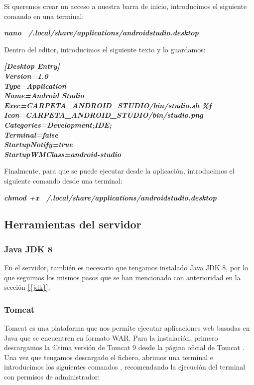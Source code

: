 Si queremos crear un acceso a nuestra barra de inicio, introducimos el siguiente comando en una terminal:

\begin{center}
	\textbf{\textit{nano ~/.local/share/applications/androidstudio.desktop}}
\end{center}

Dentro del editor, introducimos el siguiente texto y lo guardamos:

\begin{flushleft}
	\textbf{\textit{
	[Desktop Entry] \\
	Version=1.0 \\
	Type=Application \\
	Name=Android Studio \\
	Exec=CARPETA\_ANDROID\_STUDIO/bin/studio.sh \%f \\
	Icon=CARPETA\_ANDROID\_STUDIO/bin/studio.png \\
	Categories=Development;IDE; \\
	Terminal=false \\
	StartupNotify=true \\
	StartupWMClass=android-studio \\
	}}
\end{flushleft}

Finalmente, para que se puede ejecutar desde la aplicación, introducimos el siguiente comando desde una terminal:

\begin{center}
	\textbf{\textit{chmod +x ~/.local/share/applications/androidstudio.desktop}}
\end{center}


\subsection{Herramientas del servidor}

\subsubsection{Java JDK 8}

En el servidor, también es necesario que tengamos instalado Java JDK 8, por lo que seguimos los mismos pasos que se han mencionado con anterioridad en la sección \ref{{jdk}}.

\subsubsection{Tomcat}
Tomcat es una plataforma que nos permite ejecutar aplicaciones web basadas en Java que se encuentren en formato WAR. Para la instalación, primero descargamos la última versión de Tomcat 9 desde la página oficial de Tomcat \cite{tomcat:download}. Una vez que tengamos descargado el fichero, abrimos una terminal e introducimos los siguientes comandos \cite{tomcat:install}, recomendando la ejecución del terminal con permisos de administrador:

